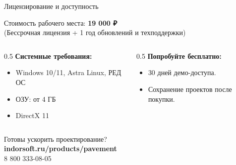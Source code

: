 \documentclass[aspectratio=169]{beamer}
\begin{document}
\begin{frame}{Лицензирование и доступность}
    \begin{center}
        \Large Стоимость рабочего места: \alert{\textbf{19 000 ₽}} \\
        \normalsize (Бессрочная лицензия + 1 год обновлений и техподдержки)
    \end{center}
    
    \vspace{0.5cm}
    \begin{columns}
        \begin{column}{0.5\textwidth}
            \textbf{Системные требования:}
            \begin{itemize}
                \item Windows 10/11, Astra Linux, РЕД ОС
                \item ОЗУ: от 4 ГБ
                \item DirectX 11
            \end{itemize}
        \end{column}
        \begin{column}{0.5\textwidth}
            \textbf{Попробуйте бесплатно:}
            \begin{itemize}
                \item 30 дней демо-доступа.
                \item Сохранение проектов после покупки.
            \end{itemize}
        \end{column}
    \end{columns}
\end{frame}

\begin{frame}[standout]
    Готовы ускорить проектирование? \\
    \vspace{0.5cm}
    \normalsize \textbf{indorsoft.ru/products/pavement} \\
    \normalsize 8 800 333-08-05
\end{frame}
\end{document}
